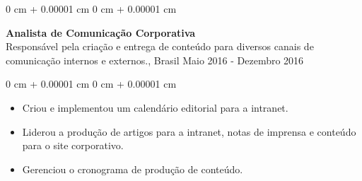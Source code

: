 \documentclass[10pt, letterpaper]{article}
\newenvironment{highlights}{
    \begin{itemize}[
        topsep=0.10 cm,
        parsep=0.10 cm,
        partopsep=0pt,
        itemsep=0pt,
        leftmargin=0 cm + 10pt
    ]
}{
    \end{itemize}
}
\newenvironment{onecolentry}{
    \begin{adjustwidth}{
        0 cm + 0.00001 cm
    }{
        0 cm + 0.00001 cm
    }
}{
    \end{adjustwidth}
}
\begin{document}
\begin{onecolentry}
    \setcolumnwidth{\fill, 4.5cm}
    \begin{paracol}{2}
        \textbf{Analista de Comunicação Corporativa} \\ Responsável pela criação e entrega de conteúdo para diversos canais de comunicação internos e externos., Brasil
        \switchcolumn
        \raggedleft Maio 2016 - Dezembro 2016
    \end{paracol}
\end{onecolentry}
\vspace{0.10cm}
\begin{onecolentry}
    \begin{highlights}
                \item Criou e implementou um calendário editorial para a intranet.
                \item Liderou a produção de artigos para a intranet, notas de imprensa e conteúdo para o site corporativo.
                \item Gerenciou o cronograma de produção de conteúdo.
    \end{highlights}
\end{onecolentry}
\end{document}
